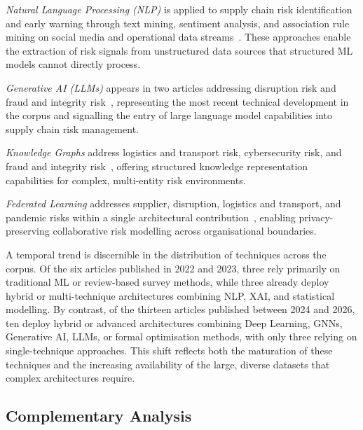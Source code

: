 \textit{Natural Language Processing (NLP)} is applied to supply chain risk identification and early warning through text mining, sentiment analysis, and association rule mining on social media and operational data streams~\cite{deivaganesh2022supply,naz2022artificial,yang2025design,rajesh2025smartops,lin2025generative}. These approaches enable the extraction of risk signals from unstructured data sources that structured ML models cannot directly process.

\textit{Generative AI (LLMs)} appears in two articles addressing disruption risk and fraud and integrity risk~\cite{lin2025generative,rajesh2025smartops}, representing the most recent technical development in the corpus and signalling the entry of large language model capabilities into supply chain risk management.

\textit{Knowledge Graphs} address logistics and transport risk, cybersecurity risk, and fraud and integrity risk~\cite{yang2024building}, offering structured knowledge representation capabilities for complex, multi-entity risk environments.

\textit{Federated Learning} addresses supplier, disruption, logistics and transport, and pandemic risks within a single architectural contribution~\cite{nguyen2024federated}, enabling privacy-preserving collaborative risk modelling across organisational boundaries.

A temporal trend is discernible in the distribution of techniques across the corpus. Of the six articles published in 2022 and 2023, three rely primarily on traditional ML or review-based survey methods, while three already deploy hybrid or multi-technique architectures combining NLP, XAI, and statistical modelling. By contrast, of the thirteen articles published between 2024 and 2026, ten deploy hybrid or advanced architectures combining Deep Learning, GNNs, Generative AI, LLMs, or formal optimisation methods, with only three relying on single-technique approaches. This shift reflects both the maturation of these techniques and the increasing availability of the large, diverse datasets that complex architectures require.


\subsection{Complementary Analysis}

